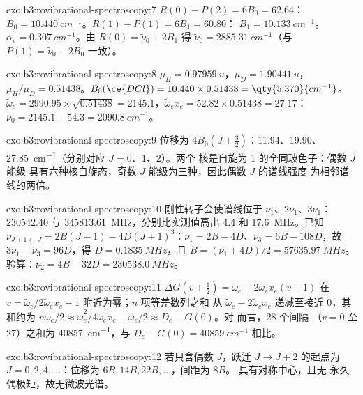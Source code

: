 \begin{solution}{exo:b3:rovibrational-spectroscopy:7}
$R(0) - P(2) = 6B_0 = 62.64$：$B_0 = \qty{10.440}{cm^{-1}}$。$R(1) - P(1) = 6B_1 = 60.80$：
$B_1 = \qty{10.133}{cm^{-1}}$。$\alpha_e = \qty{0.307}{cm^{-1}}$。由 $R(0) = \tilde\nu_0 + 2B_1$ 得
$\tilde\nu_0 = \qty{2885.31}{cm^{-1}}$（与 $P(1) = \tilde\nu_0 - 2B_0$ 一致）。
\end{solution}

\begin{solution}{exo:b3:rovibrational-spectroscopy:8}
$\mu_H = \qty{0.97959}{u}$，$\mu_D = \qty{1.90441}{u}$，$\mu_H/\mu_D = 0.51438$。$B_0(\ce{DCl})
= 10.440 \times 0.51438 = \qty{5.370}{cm^{-1}}$。$\tilde\omega_e = 2990.95 \times \sqrt{0.51438}
= 2145.1$，$\tilde\omega_ex_e = 52.82 \times 0.51438 = 27.17$：$\tilde\nu_0 = 2145.1 - 54.3 =
\qty{2090.8}{cm^{-1}}$。
\end{solution}

\begin{solution}{exo:b3:rovibrational-spectroscopy:9}
位移为 $4B_0(J + \frac32)$：11.94、19.90、\qty{27.85}{cm^{-1}}（分别对应 $J = 0$、1、2）。两个
 核是自旋为 1 的全同玻色子：偶数 $J$ 能级
具有六种核自旋态，奇数 $J$ 能级为三种，因此偶数 $J$ 的谱线强度
为相邻谱线的两倍。
\end{solution}

\begin{solution}{exo:b3:rovibrational-spectroscopy:10}
刚性转子会使谱线位于 $\nu_1$、$2\nu_1$、$3\nu_1$：$230542.40$ 与
\qty{345813.61}{MHz}，分别比实测值高出 4.4 和 \qty{17.6}{MHz}。已知
$\nu_{J+1\leftarrow J} = 2B(J+1) - 4D(J+1)^3$：$\nu_1 = 2B - 4D$、$\nu_3 = 6B - 108D$，故
$3\nu_1 - \nu_3 = 96D$，得 $D = \qty{0.1835}{MHz}$，且 $B = (\nu_1 + 4D)/2 =
\qty{57635.97}{MHz}$。验算：$\nu_2 = 4B - 32D = \qty{230538.0}{MHz}$。
\end{solution}

\begin{solution}{exo:b3:rovibrational-spectroscopy:11}
$\Delta G(v + \frac12) = \tilde\omega_e - 2\tilde\omega_ex_e(v+1)$ 在 $v =
\tilde\omega_e/2\tilde\omega_ex_e - 1$ 附近为零；$n$ 项等差数列之和
从 $\tilde\omega_e - 2\tilde\omega_ex_e$ 递减至接近 0，其和约为 $n\tilde\omega_e/2 \approx
\tilde\omega_e^2/4\tilde\omega_ex_e - \tilde\omega_e/2 \approx D_e - G(0)$。对  而言，28 个间隔
（$v = 0$ 至 27）之和为 \qty{40857}{cm^{-1}}，与 $D_e - G(0) = \qty{40859}{cm^{-1}}$ 相比。
\end{solution}

\begin{solution}{exo:b3:rovibrational-spectroscopy:12}
若只含偶数 $J$，跃迁 $J \to J + 2$ 的起点为 $J = 0, 2, 4, \dots$：位移为
$6B, 14B, 22B, \dots$，间距为 $8B$。 具有对称中心，且无
永久偶极矩，故无微波光谱。
\end{solution}

